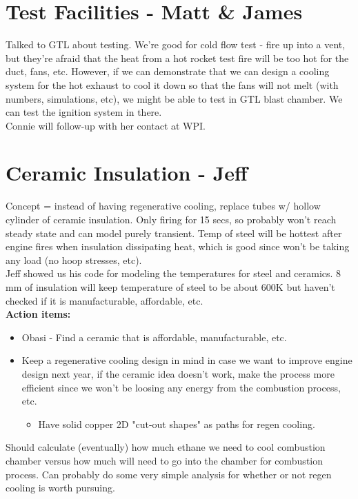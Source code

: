 \documentclass[12pt]{article}
\begin{document}
\section{Test Facilities - Matt \& James}
Talked to GTL about testing. We're good for cold flow test - fire up into a vent, but they're afraid that the heat from a hot rocket test fire will be too hot for the duct, fans, etc. However, if we can demonstrate that we can design a cooling system for the hot exhaust to cool it down so that the fans will not melt (with numbers, simulations, etc), we might be able to test in GTL blast chamber. We can test the ignition system in there.\\

\noindent Connie will follow-up with her contact at WPI.

\section{Ceramic Insulation - Jeff}
Concept = instead of having regenerative cooling, replace tubes w/ hollow cylinder of ceramic insulation. Only firing for 15 secs, so probably won't reach steady state and can model purely transient. Temp of steel will be hottest after engine fires when insulation dissipating heat, which is good since won't be taking any load (no hoop stresses, etc).\\

\noindent Jeff showed us his code for modeling the temperatures for steel and ceramics. 8 mm of insulation will keep temperature of steel to be about 600K but haven't checked if it is manufacturable, affordable, etc.\\

\noindent \textbf{Action items:}
\begin{itemize}
\item{Obasi - Find a ceramic that is affordable, manufacturable, etc.}
\item{Keep a regenerative cooling design in mind in case we want to improve engine design next year, if the ceramic idea doesn't work, make the process more efficient since we won't be loosing any energy from the combustion process, etc.}
\begin{itemize}
\item
Have solid copper 2D "cut-out shapes" as paths for regen cooling.
\end{itemize}
\end{itemize}

\noindent Should calculate (eventually) how much ethane we need to cool combustion chamber versus how much will need to go into the chamber for combustion process. Can probably do some very simple analysis for whether or not regen cooling is worth pursuing.
\end{document}
